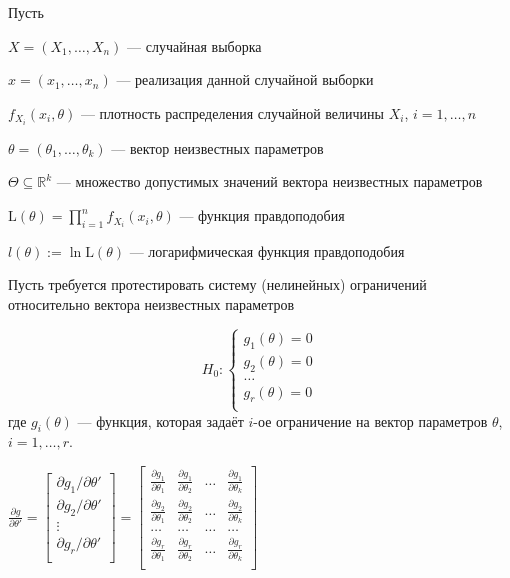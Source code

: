 \documentclass[pdftex,11pt,openany]{book}\usepackage[]{graphicx}\usepackage[]{color}
\begin{document}
\begin{problemtext}
Пусть

$X = (X_1,\ldots,X_n)$ --- случайная выборка

$x = (x_1,\ldots,x_n)$ --- реализация данной случайной выборки

$f_{X_i}(x_i, \theta)$ --- плотность распределения случайной величины $X_i$, $i = 1,\ldots, n$

$\theta = (\theta_1, \ldots, \theta_k)$ --- вектор неизвестных параметров

$\Theta \subseteq \mathbb{R}^k$ --- множество допустимых значений вектора неизвестных параметров

$\text{L}(\theta) = \prod_{i=1}^n f_{X_i}(x_i, \theta)$ --- функция правдоподобия

$l(\theta) := \ln \text{L}(\theta)$ --- логарифмическая функция правдоподобия

Пусть требуется протестировать систему (нелинейных) ограничений относительно вектора неизвестных параметров

$$H_0: \begin{cases}
g_1(\theta) = 0 \\
g_2(\theta) = 0 \\
\ldots \\
g_r(\theta) = 0 \\
\end{cases}$$
где $g_i(\theta)$ --- функция, которая задаёт $i$-ое ограничение на вектор параметров $\theta$, $i = 1,\ldots, r$.

$\frac{\partial g}{\partial \theta'} = \begin{bmatrix}
\partial g_1/\partial \theta' \\
\partial g_2/\partial \theta' \\
\vdots \\
\partial g_r/\partial \theta' \\
\end{bmatrix} = \begin{bmatrix}
\frac{\partial g_1}{\partial \theta_1} & \frac{\partial g_1}{\partial \theta_2} & \ldots & \frac{\partial g_1}{\partial \theta_k}\\
\frac{\partial g_2}{\partial \theta_1} & \frac{\partial g_2}{\partial \theta_2} & \ldots & \frac{\partial g_2}{\partial \theta_k}\\
\ldots & \ldots & \ldots & \ldots \\
\frac{\partial g_r}{\partial \theta_1} & \frac{\partial g_r}{\partial \theta_2} & \ldots & \frac{\partial g_r}{\partial \theta_k}\\
\end{bmatrix}$


\end{problemtext}
\end{document}
